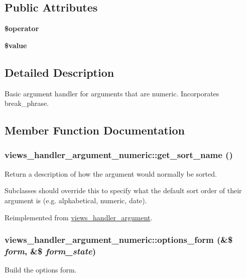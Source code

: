 \subsection*{Public Attributes}
\begin{DoxyCompactItemize}
\item 
\hypertarget{classviews__handler__argument__numeric_a730e81a32356a6b85806c90c62717402}{
{\bfseries \$operator}}
\label{classviews__handler__argument__numeric_a730e81a32356a6b85806c90c62717402}

\item 
\hypertarget{classviews__handler__argument__numeric_aad3af1b886af14397a2dfd557e8938fb}{
{\bfseries \$value}}
\label{classviews__handler__argument__numeric_aad3af1b886af14397a2dfd557e8938fb}

\end{DoxyCompactItemize}


\subsection{Detailed Description}
Basic argument handler for arguments that are numeric. Incorporates break\_\-phrase. 

\subsection{Member Function Documentation}
\hypertarget{classviews__handler__argument__numeric_a6d3833ca6193a755babc3f47b68da495}{
\subsubsection[{get\_\-sort\_\-name}]{\setlength{\rightskip}{0pt plus 5cm}views\_\-handler\_\-argument\_\-numeric::get\_\-sort\_\-name ()}}
\label{classviews__handler__argument__numeric_a6d3833ca6193a755babc3f47b68da495}
Return a description of how the argument would normally be sorted.

Subclasses should override this to specify what the default sort order of their argument is (e.g. alphabetical, numeric, date). 

Reimplemented from \hyperlink{classviews__handler__argument_a9fad9ab1a7aaa5915baf13a2872faa70}{views\_\-handler\_\-argument}.\hypertarget{classviews__handler__argument__numeric_ab30359963ec4962258bb8db3b6a870c4}{
\subsubsection[{options\_\-form}]{\setlength{\rightskip}{0pt plus 5cm}views\_\-handler\_\-argument\_\-numeric::options\_\-form (\&\$ {\em form}, \/  \&\$ {\em form\_\-state})}}
\label{classviews__handler__argument__numeric_ab30359963ec4962258bb8db3b6a870c4}
Build the options form. 

